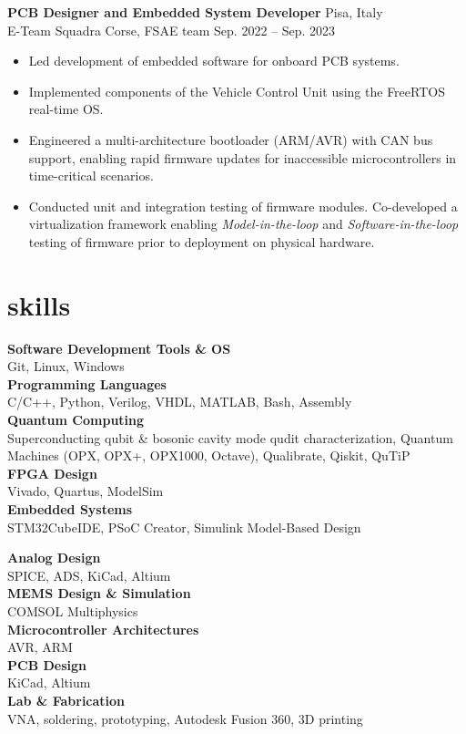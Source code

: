 \documentclass[11pt]{article}
\newcommand{\entry}[4]{{{\textbf{#1}}} \hfill #3 \\ #2 \hfill #4}
\begin{document}
	\entry{PCB Designer and Embedded System Developer}{E-Team Squadra Corse, FSAE team}{Pisa, Italy}{Sep. 2022 -- Sep. 2023}
	\begin{itemize}[noitemsep,leftmargin=10.0mm,rightmargin=0mm,topsep=6pt]
		\item Led development of embedded software for onboard PCB systems.
		\item Implemented components of the Vehicle Control Unit using the FreeRTOS real-time OS.
		\item Engineered a multi-architecture bootloader (ARM/AVR) with CAN bus support, enabling rapid firmware updates for inaccessible microcontrollers in time-critical scenarios.
		
		\item Conducted unit and integration testing of firmware modules. Co-developed a virtualization framework enabling \textit{Model-in-the-loop} and \textit{Software-in-the-loop} testing of firmware prior to deployment on physical hardware.
	\end{itemize}
	
	\section{skills}
	\begin{minipage}[t]{0.48\textwidth}
		\textbf{Software Development Tools \& OS} \\
		Git, Linux, Windows
		\\[4pt]
		\textbf{Programming Languages} \\
		C/C++, Python, Verilog, VHDL, MATLAB, Bash, Assembly \\[4pt]
		\textbf{Quantum Computing} \\
		Superconducting qubit \& bosonic cavity mode qudit characterization, Quantum Machines (OPX, OPX+, OPX1000, Octave), Qualibrate, Qiskit, QuTiP \\[4pt]
		\textbf{FPGA Design} \\
		Vivado, Quartus, ModelSim
		\\[4pt]
		\textbf{Embedded Systems} \\
		STM32CubeIDE, PSoC Creator, Simulink Model-Based Design
	\end{minipage}
	\hfill
	\begin{minipage}[t]{0.48\textwidth}
		\textbf{Analog Design} \\
		SPICE, ADS, KiCad, Altium
		\\[4pt]
		\textbf{MEMS Design \& Simulation} \\
		COMSOL Multiphysics \\[4pt]
		\textbf{Microcontroller Architectures} \\
		AVR, ARM
		\\[4pt]
		\textbf{PCB Design} \\
		KiCad, Altium
		\\[4pt]
		\textbf{Lab \& Fabrication} \\
		VNA, soldering, prototyping, Autodesk Fusion 360, 3D printing
	\end{minipage}
	
\end{document}
